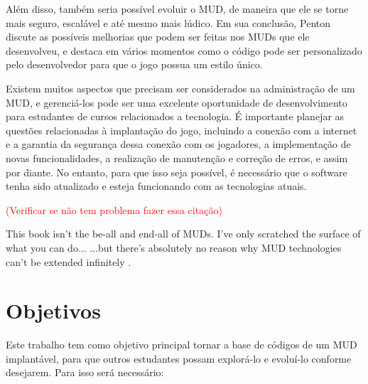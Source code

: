 Além disso, também seria possível evoluir o MUD, de maneira que ele se torne mais seguro, escalável e até 
mesmo mais lúdico. Em sua conclusão, Penton discute as possíveis melhorias que podem ser feitas nos MUDs 
que ele desenvolveu, e destaca em vários momentos como o código pode ser personalizado pelo desenvolvedor 
para que o jogo possua um estilo único.

Existem muitos aspectos que precisam ser considerados na administração de um MUD, e gerenciá-los pode ser 
uma excelente oportunidade de desenvolvimento para estudantes de cursos relacionados a tecnologia. 
É importante planejar as questões relacionadas à implantação do jogo, incluindo a conexão com a internet 
e a garantia da segurança dessa conexão com os jogadores, a implementação de novas funcionalidades, a 
realização de manutenção e correção de erros,  e assim por diante. No entanto, para que isso seja possível, 
é necessário que o software tenha sido atualizado e esteja funcionando com as tecnologias atuais.

\textcolor{red}{(Verificar se não tem problema fazer essa citação)}
\begin{citacao}
    This book isn't the be-all and end-all of MUDs. I've only scratched the surface of what you can do... ...but there's absolutely no reason why MUD technologies can't be extended infinitely \cite{penton2003mud}.
\end{citacao}



\section{Objetivos}

Este trabalho tem como objetivo principal tornar a base de códigos de um MUD implantável, para que outros 
estudantes possam explorá-lo e evoluí-lo conforme desejarem. Para isso será necessário:

